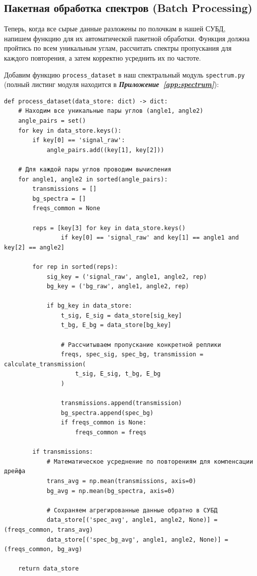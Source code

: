 \subsection{Пакетная обработка спектров (Batch Processing)}

Теперь, когда все сырые данные разложены по полочкам в нашей СУБД, напишем функцию для их автоматической пакетной обработки. Функция должна пройтись по всем уникальным углам, рассчитать спектры пропускания для каждого повторения, а затем корректно усреднить их по частоте.

Добавим функцию \texttt{process\_dataset} в наш спектральный модуль \texttt{spectrum.py} (полный листинг модуля находится в \textbf{\textit{Приложение~\ref{app:spectrum}}}):

\begin{listing}[H]
	\caption{Пакетная обработка базы данных (spectrum.py)}
	\begin{verbatim}
def process_dataset(data_store: dict) -> dict:
    # Находим все уникальные пары углов (angle1, angle2)
    angle_pairs = set()
    for key in data_store.keys():
        if key[0] == 'signal_raw':
            angle_pairs.add((key[1], key[2]))
            
    # Для каждой пары углов проводим вычисления
    for angle1, angle2 in sorted(angle_pairs):
        transmissions = []
        bg_spectra = []
        freqs_common = None
        
        reps = [key[3] for key in data_store.keys() 
                if key[0] == 'signal_raw' and key[1] == angle1 and key[2] == angle2]
                
        for rep in sorted(reps):
            sig_key = ('signal_raw', angle1, angle2, rep)
            bg_key = ('bg_raw', angle1, angle2, rep)
            
            if bg_key in data_store:
                t_sig, E_sig = data_store[sig_key]
                t_bg, E_bg = data_store[bg_key]
                
                # Рассчитываем пропускание конкретной реплики
                freqs, spec_sig, spec_bg, transmission = calculate_transmission(
                    t_sig, E_sig, t_bg, E_bg
                )
                
                transmissions.append(transmission)
                bg_spectra.append(spec_bg)
                if freqs_common is None:
                    freqs_common = freqs
                    
        if transmissions:
            # Математическое усреднение по повторениям для компенсации дрейфа
            trans_avg = np.mean(transmissions, axis=0)
            bg_avg = np.mean(bg_spectra, axis=0)
            
            # Сохраняем агрегированные данные обратно в СУБД
            data_store[('spec_avg', angle1, angle2, None)] = (freqs_common, trans_avg)
            data_store[('spec_bg_avg', angle1, angle2, None)] = (freqs_common, bg_avg)
            
    return data_store
	\end{verbatim}
\end{listing}



